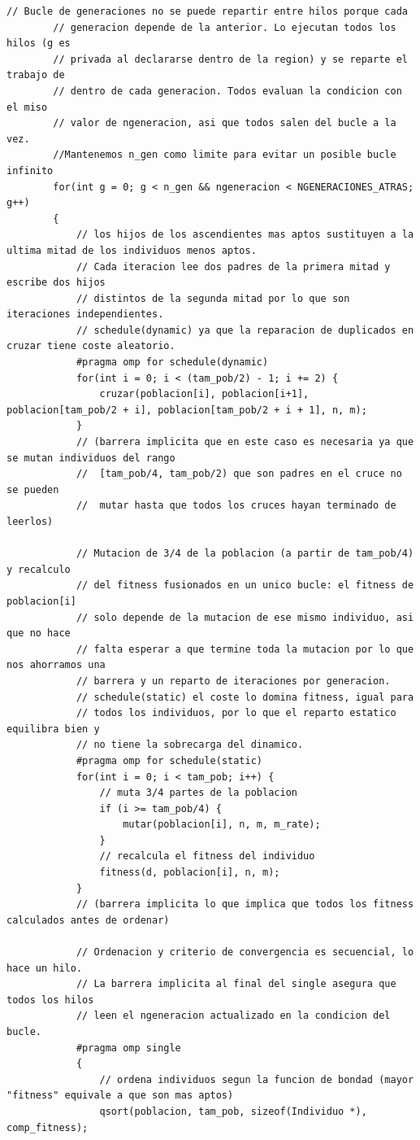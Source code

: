 \documentclass[12pt]{article}
\begin{document}
\begin{lstlisting}[style=EstiloC]
        // Bucle de generaciones no se puede repartir entre hilos porque cada
        // generacion depende de la anterior. Lo ejecutan todos los hilos (g es
        // privada al declararse dentro de la region) y se reparte el trabajo de
        // dentro de cada generacion. Todos evaluan la condicion con el miso
        // valor de ngeneracion, asi que todos salen del bucle a la vez.
        //Mantenemos n_gen como limite para evitar un posible bucle infinito
        for(int g = 0; g < n_gen && ngeneracion < NGENERACIONES_ATRAS; g++)
        {
            // los hijos de los ascendientes mas aptos sustituyen a la ultima mitad de los individuos menos aptos.
            // Cada iteracion lee dos padres de la primera mitad y escribe dos hijos
            // distintos de la segunda mitad por lo que son iteraciones independientes.
            // schedule(dynamic) ya que la reparacion de duplicados en cruzar tiene coste aleatorio.
            #pragma omp for schedule(dynamic)
            for(int i = 0; i < (tam_pob/2) - 1; i += 2) {
                cruzar(poblacion[i], poblacion[i+1], poblacion[tam_pob/2 + i], poblacion[tam_pob/2 + i + 1], n, m);
            }
            // (barrera implicita que en este caso es necesaria ya que se mutan individuos del rango
            //  [tam_pob/4, tam_pob/2) que son padres en el cruce no se pueden
            //  mutar hasta que todos los cruces hayan terminado de leerlos)

            // Mutacion de 3/4 de la poblacion (a partir de tam_pob/4) y recalculo
            // del fitness fusionados en un unico bucle: el fitness de poblacion[i]
            // solo depende de la mutacion de ese mismo individuo, asi que no hace
            // falta esperar a que termine toda la mutacion por lo que nos ahorramos una
            // barrera y un reparto de iteraciones por generacion.
            // schedule(static) el coste lo domina fitness, igual para
            // todos los individuos, por lo que el reparto estatico equilibra bien y
            // no tiene la sobrecarga del dinamico.
            #pragma omp for schedule(static)
            for(int i = 0; i < tam_pob; i++) {
                // muta 3/4 partes de la poblacion
                if (i >= tam_pob/4) {
                    mutar(poblacion[i], n, m, m_rate);
                }
                // recalcula el fitness del individuo
                fitness(d, poblacion[i], n, m);
            }
            // (barrera implicita lo que implica que todos los fitness calculados antes de ordenar)

            // Ordenacion y criterio de convergencia es secuencial, lo hace un hilo.
            // La barrera implicita al final del single asegura que todos los hilos
            // leen el ngeneracion actualizado en la condicion del bucle.
            #pragma omp single
            {
                // ordena individuos segun la funcion de bondad (mayor "fitness" equivale a que son mas aptos)
                qsort(poblacion, tam_pob, sizeof(Individuo *), comp_fitness);


\end{lstlisting}
\end{document}
